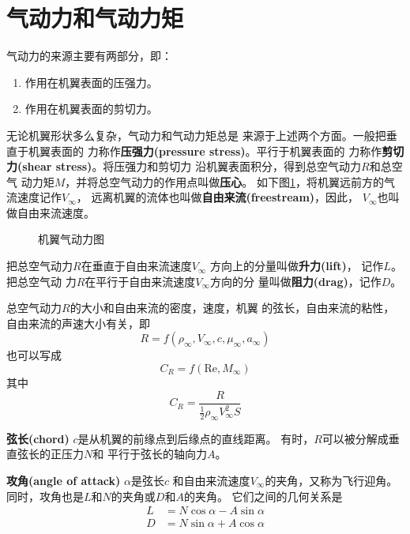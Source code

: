 \section{气动力和气动力矩}
\label{气动力和气动力矩}
气动力的来源主要有两部分，即：
\begin{enumerate}
	\item 作用在机翼表面的压强力。
	\item 作用在机翼表面的剪切力。
\end{enumerate}
无论机翼形状多么复杂，气动力和气动力矩总是
来源于上述两个方面。一般把垂直于机翼表面的
力称作{\bfseries 压强力(pressure stress)}。平行于机翼表面的
力称作{\bfseries 剪切力(shear stress)}。将压强力和剪切力
沿机翼表面积分，得到总空气动力$R$和总空气
动力矩$M$，并将总空气动力的作用点叫做{\bfseries 压心}。
如下图\ref{fig:airfoil force}，将机翼远前方的气流速度记作$V_\infty$，
远离机翼的流体也叫做{\bfseries 自由来流(freestream)}，因此，
$V_\infty$也叫做自由来流速度。

\begin{figure}[!ht]
	\centering
	
  \caption{机翼气动力图}
  \label{fig:airfoil force}
\end{figure}

把总空气动力$R$在垂直于自由来流速度$V_\infty$
方向上的分量叫做{\bfseries 升力(lift)}，
记作$L$。把总空气动
力$R$在平行于自由来流速度$V_\infty$方向的分
量叫做{\bfseries 阻力(drag)}，记作$D$。

总空气动力$R$的大小和自由来流的密度，速度，机翼
的弦长，自由来流的粘性，自由来流的声速大小有关，即
\[
  R=f(\rho_\infty,V_\infty,c,\mu_\infty,a_\infty)
\]
也可以写成
\[
  C_R=f(\mathrm{Re},M_\infty)
\]
其中
\[
  C_R=\frac{R}{\frac{1}{2}\rho_\infty V_\infty ^2 S}
\]

{\bfseries 弦长(chord)} $c$是从机翼的前缘点到后缘点的直线距离。
有时，$R$可以被分解成垂直弦长的正压力$N$和
平行于弦长的轴向力$A$。

{\bfseries 攻角(angle of attack)} $\alpha$是弦长$c$
和自由来流速度$V_\infty$的夹角，又称为飞行迎角。
同时，攻角也是$L$和$N$的夹角或$D$和$A$的夹角。
它们之间的几何关系是
\begin{align*}
	L & =N \cos \alpha -A \sin \alpha \\
	D & =N \sin \alpha +A \cos \alpha
\end{align*}


